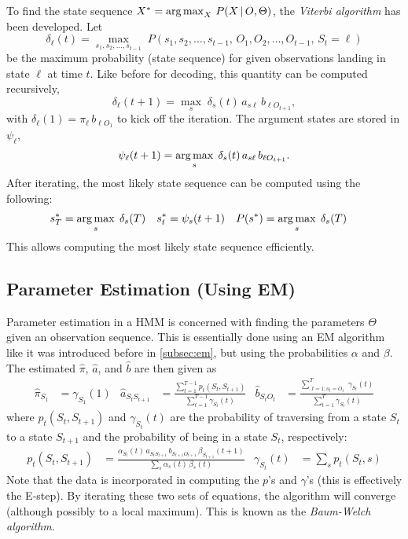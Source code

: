 			To find the state sequence \(X^\ast = \operatorname*{arg\,max}_X \, P(X \,\vert\, O, \Theta) \), the \emph{Viterbi algorithm} has been developed. Let
			\begin{equation}
				\delta_\ell(t) = \max_{s_1, s_2, \dots, s_{t - 1}} \; P(s_1, s_2, \dots, s_{t - 1},\, O_1, O_2, \dots, O_{t - 1},\, S_t = \ell)
			\end{equation}
			be the maximum probability (state sequence) for given observations landing in state \(\ell\) at time \(t\). Like before for decoding, this quantity can be computed recursively,
			\begin{equation}
				\delta_\ell(t + 1) = \max_s \; \delta_s(t) \, a_{s \ell} \, b_{\ell O_{t + 1}},
			\end{equation}
			with \( \delta_\ell(1) = \pi_\ell \, b_{\ell O_1} \) to kick off the iteration. The argument states are stored in \( \psi_\ell \),
			\begin{equation}
				\psi_\ell(t + 1) = \operatorname*{arg\,max}_s \; \delta_s(t) \, a_{s \ell} \, b_{\ell O_{t + 1}}.
			\end{equation}
			After iterating, the most likely state sequence can be computed using the following:
			\begin{align}
				s_T^\ast &= \operatorname*{arg\,max}_s \; \delta_s(T) &
				s_t^\ast &= \psi_s(t + 1) &
				P(s^\ast) &= \operatorname*{arg\,max}_s \; \delta_s(T)
			\end{align}
			This allows computing the most likely state sequence efficiently.

		\subsection{Parameter Estimation (Using EM)}
			Parameter estimation in a HMM is concerned with finding the parameters \(\Theta\) given an observation sequence. This is essentially done using an EM algorithm like it was introduced before in \autoref{subsec:em}, but using the probabilities \(\alpha\) and \(\beta\). The estimated \(\hat{\pi}\), \(\hat{a}\), and \(\hat{b}\) are then given as
			\begin{align}
				\hat{\pi}_{S_1} &= \gamma_{S_1}(1) &
				\hat{a}_{S_t S_{t + 1}} &= \frac{\sum_{t = 1}^{T - 1} p_t(S_t, S_{t + 1})}{\sum_{t = 1}^{T - 1} \gamma_{S_t}(t)} &
				\hat{b}_{S_t O_t} &= \frac{\sum_{\substack{t = 1; o_t = O_t}}^{T} \gamma_{S_t}(t)}{\sum_{t = 1}^{T} \gamma_{S_t}(t)}
			\end{align}
			where \( p_t(S_t, S_{t + 1}) \) and \( \gamma_{S_t}(t) \) are the probability of traversing from a state \(S_t\) to a state \(S_{t + 1}\) and the probability of being in a state \(S_t\), respectively:
			\begin{align}
				p_t(S_t, S_{t + 1}) &= \frac{\alpha_{S_t}(t) \, a_{S_t S_{t + 1}} \, b_{S_{t + 1} O_{t + 1}} \, \beta_{S_{t + 1}}(t + 1)}{\sum_s \alpha_s(t) \, \beta_s(t)} &
				\gamma_{S_t}(t) &= \sum_s p_t(S_t, s)
			\end{align}
			Note that the data is incorporated in computing the \(p\)'s and \(\gamma\)'s (this is effectively the E-step). By iterating these two sets of equations, the algorithm will converge (although possibly to a local maximum). This is known as the \emph{Baum-Welch algorithm}.

